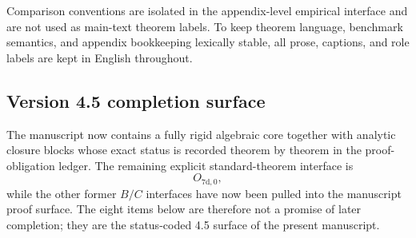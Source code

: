 \documentclass[11pt,a4paper]{article}
\theoremstyle{definition}
\theoremstyle{remark}
\begin{document}
Comparison conventions are isolated in the appendix-level empirical interface and are not used as
main-text theorem labels. To keep theorem language, benchmark semantics, and appendix bookkeeping
lexically stable, all prose, captions, and role labels are kept in English throughout.

\subsection{Version 4.5 completion surface}

The manuscript now contains a fully rigid algebraic core together with analytic closure blocks
whose exact status is recorded theorem by theorem in the proof-obligation ledger. The remaining
explicit standard-theorem interface is
\[
O_{7\mathrm{d,0}},
\]
while the other former $B/C$ interfaces have now been pulled into the manuscript proof surface. The
eight items below are therefore not a promise of later completion; they are the status-coded 4.5
surface of the present manuscript.
\end{document}
